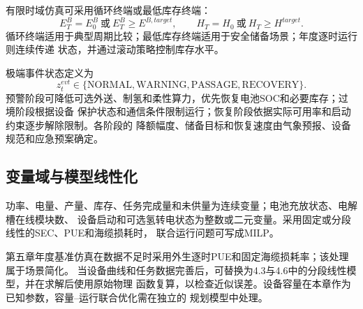 有限时域仿真可采用循环终端或最低库存终端：
\begin{equation}
E_T^B=E_0^B\ \text{或}\ E_T^B\ge E^{B,target},\qquad
H_T=H_0\ \text{或}\ H_T\ge H^{target}.
\label{eq:terminal-rules}
\end{equation}
循环终端适用于典型周期比较；最低库存终端适用于安全储备场景；年度逐时运行则连续传递
状态，并通过滚动策略控制库存水平。

极端事件状态定义为
\begin{equation}
z_t^{evt}\in\{\mathrm{NORMAL},\mathrm{WARNING},
\mathrm{PASSAGE},\mathrm{RECOVERY}\}.
\label{eq:event-state}
\end{equation}
预警阶段可降低可选外送、制氢和柔性算力，优先恢复电池SOC和必要库存；过境阶段根据设备
保护状态和通信条件限制运行；恢复阶段依据实际可用率和启动约束逐步解除限制。各阶段的
降额幅度、储备目标和恢复速度由气象预报、设备规范和应急预案确定。

\subsection{变量域与模型线性化}

功率、电量、产量、库存、任务完成量和未供量为连续变量；电池充放状态、电解槽在线模块数、
设备启动和可选氢转电状态为整数或二元变量。采用固定或分段线性的SEC、PUE和海缆损耗时，
联合运行问题可写成MILP。

第五章年度基准仿真在数据不足时采用外生逐时PUE和固定海缆损耗率；该处理属于场景简化。
当设备曲线和任务数据完善后，可替换为4.3与4.6中的分段线性模型，并在求解后使用原始物理
函数复算，以检查近似误差。设备容量在本章作为已知参数，容量--运行联合优化需在独立的
规划模型中处理。
